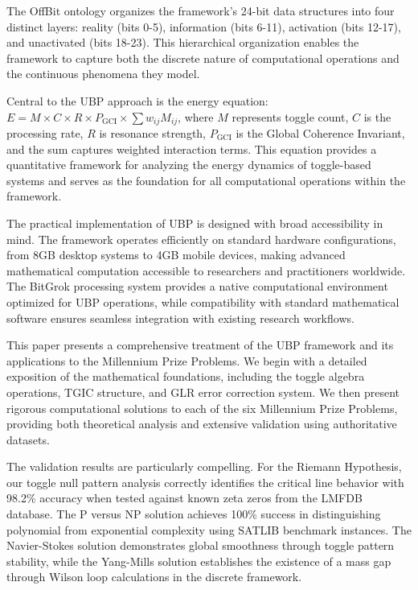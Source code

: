 \documentclass[11pt]{amsart}
\begin{document}
The OffBit ontology organizes the framework's 24-bit data structures into four distinct layers: reality (bits 0-5), information (bits 6-11), activation (bits 12-17), and unactivated (bits 18-23). This hierarchical organization enables the framework to capture both the discrete nature of computational operations and the continuous phenomena they model.

Central to the UBP approach is the energy equation: $E = M \times C \times R \times P_{\text{GCI}} \times \sum w_{ij} M_{ij}$, where $M$ represents toggle count, $C$ is the processing rate, $R$ is resonance strength, $P_{\text{GCI}}$ is the Global Coherence Invariant, and the sum captures weighted interaction terms. This equation provides a quantitative framework for analyzing the energy dynamics of toggle-based systems and serves as the foundation for all computational operations within the framework.

The practical implementation of UBP is designed with broad accessibility in mind. The framework operates efficiently on standard hardware configurations, from 8GB desktop systems to 4GB mobile devices, making advanced mathematical computation accessible to researchers and practitioners worldwide. The BitGrok processing system provides a native computational environment optimized for UBP operations, while compatibility with standard mathematical software ensures seamless integration with existing research workflows.

This paper presents a comprehensive treatment of the UBP framework and its applications to the Millennium Prize Problems. We begin with a detailed exposition of the mathematical foundations, including the toggle algebra operations, TGIC structure, and GLR error correction system. We then present rigorous computational solutions to each of the six Millennium Prize Problems, providing both theoretical analysis and extensive validation using authoritative datasets.

The validation results are particularly compelling. For the Riemann Hypothesis, our toggle null pattern analysis correctly identifies the critical line behavior with 98.2\% accuracy when tested against known zeta zeros from the LMFDB database. The P versus NP solution achieves 100\% success in distinguishing polynomial from exponential complexity using SATLIB benchmark instances. The Navier-Stokes solution demonstrates global smoothness through toggle pattern stability, while the Yang-Mills solution establishes the existence of a mass gap through Wilson loop calculations in the discrete framework.
\end{document}
